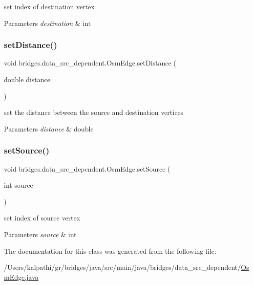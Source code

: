 set index of destination vertex 
\begin{DoxyParams}{Parameters}
{\em destination} & int \\
\hline
\end{DoxyParams}
\mbox{\label{classbridges_1_1data__src__dependent_1_1_osm_edge_afe9d2fa452c89d08d7c1a23ff3302c62}} 
\subsubsection{\texorpdfstring{setDistance()}{setDistance()}}
{\footnotesize\ttfamily void bridges.\+data\+\_\+src\+\_\+dependent.\+Osm\+Edge.\+set\+Distance (\begin{DoxyParamCaption}\item[{double}]{distance }\end{DoxyParamCaption})}

set the distance between the source and destination vertices 
\begin{DoxyParams}{Parameters}
{\em distance} & double \\
\hline
\end{DoxyParams}
\mbox{\label{classbridges_1_1data__src__dependent_1_1_osm_edge_aa61fb02ce746b89c26c71cd2f20053e7}} 
\subsubsection{\texorpdfstring{setSource()}{setSource()}}
{\footnotesize\ttfamily void bridges.\+data\+\_\+src\+\_\+dependent.\+Osm\+Edge.\+set\+Source (\begin{DoxyParamCaption}\item[{int}]{source }\end{DoxyParamCaption})}

set index of source vertex 
\begin{DoxyParams}{Parameters}
{\em source} & int \\
\hline
\end{DoxyParams}


The documentation for this class was generated from the following file\+:\begin{DoxyCompactItemize}
\item 
/\+Users/kalpathi/gr/bridges/java/src/main/java/bridges/data\+\_\+src\+\_\+dependent/\mbox{\hyperlink{_osm_edge_8java}{Osm\+Edge.\+java}}\end{DoxyCompactItemize}

